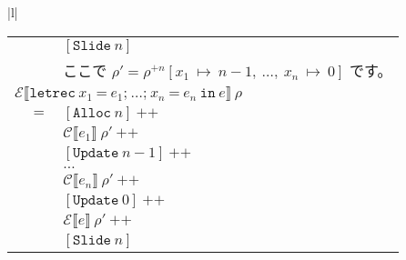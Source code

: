 \documentclass{jarticle}
\begin{document}
\begin{tabular} {|l|}
\begin{tabular}{r c l}
		                                                                         &     & $\left[\texttt{Slide} ~ n\right]$                                                                                               \\
		                                                                         &     & ここで $\rho' = \rho^{+n} \left[x_1 ~ \mapsto ~ n - 1, ~ \ldots , ~ x_n ~ \mapsto ~ 0\right]$ です。                            \\
		\multicolumn{3}{l}{$\mathcal{E} \llbracket \texttt{letrec} ~ x_1 ~ \texttt{=} ~ e_1\texttt{;} ~  \ldots \texttt{;} ~ x_n ~ \texttt{=} ~ e_n ~ \texttt{in} ~ e \rrbracket ~ \rho$}                                \\
		                                                                         & $=$ & $\left[\texttt{Alloc} ~ n\right] ~ \texttt{++}$                                                                                 \\
		                                                                         &     & $\mathcal{C} \llbracket e_1 \rrbracket ~ \rho' ~ \texttt{++}$                                                                   \\
		                                                                         &     & $\left[\texttt{Update} ~ n - 1\right] ~ \texttt{++}$                                                                            \\
		                                                                         &     & $\ldots$                                                                                                                        \\
		                                                                         &     & $\mathcal{C} \llbracket e_n \rrbracket ~ \rho' ~ \texttt{++}$                                                                   \\
		                                                                         &     & $\left[\texttt{Update} ~ 0\right] ~ \texttt{++}$                                                                                \\
		                                                                         &     & $\mathcal{E} \llbracket e \rrbracket ~ \rho' ~ \texttt{++}$                                                                     \\
		                                                                         &     & $\left[\texttt{Slide} ~ n\right]$                                                                                               \\

\end{tabular}
\end{tabular}
\end{document}
